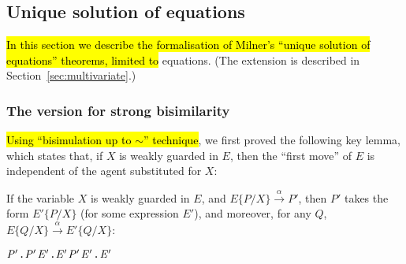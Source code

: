 
\subsection{Unique solution of equations}
\label{ss:part2}

\hl{In this section we describe the formalisation of Milner's
``unique solution of equations'' theorems, limited to} \univariate equations. (The
\multivariate extension is described in Section~\ref{sec:multivariate}.)

\subsubsection{The version for strong bisimilarity}

\hl{Using ``bisimulation up to $\sim$'' technique}, we first proved the following
key lemma, which states that, if $X$ is weakly guarded
in $E$, then the ``first move'' of $E$ is independent of the agent
substituted for $X$:
\begin{lemma}
\label{lem:313}
If the variable $X$ is weakly guarded in $E$, and
$E\{P/X\}\overset{\alpha}{\rightarrow} P'$, then $P'$ takes the form
$E'\{P/X\}$ (for some expression $E'$), and moreover, for any $Q$,
$E\{Q/X\}\overset{\alpha}{\rightarrow} E'\{Q/X\}$:
\begin{alltt}
\HOLTokenTurnstile{}   \HOLSymConst{\HOLTokenImp{}}
   \HOLSymConst{\HOLTokenForall{}}  \ensuremath{\HOLBoundVar{P}\sp{\prime}}.   \HOLTokenTransBegin{}\HOLTokenTransEnd \ensuremath{\HOLBoundVar{P}\sp{\prime}} \HOLSymConst{\HOLTokenImp{}} \HOLSymConst{\HOLTokenExists{}}\ensuremath{\HOLBoundVar{E}\sp{\prime}}.  \ensuremath{\HOLBoundVar{E}\sp{\prime}} \HOLSymConst{\HOLTokenConj{}} \ensuremath{\HOLBoundVar{P}\sp{\prime}} \HOLSymConst{\ensuremath{=}} \ensuremath{\HOLBoundVar{E}\sp{\prime}}  \HOLSymConst{\HOLTokenConj{}} \HOLSymConst{\HOLTokenForall{}}.   \HOLTokenTransBegin{}\HOLTokenTransEnd \ensuremath{\HOLBoundVar{E}\sp{\prime}} 
\end{alltt}
\end{lemma}

